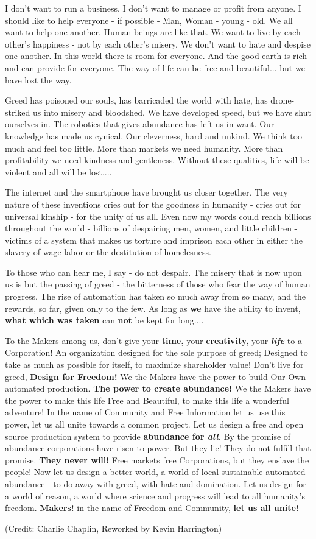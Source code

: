 \documentclass{article}
\begin{document}
{\fontsize{11pt}{11pt}\selectfont
I don't want to run a business. I don't want to manage or profit from
anyone. I should like to help everyone - if possible - Man, Woman -
young - old. We all want to help one another. Human beings are like
that. We want to live by each other's happiness - not by each other's
misery. We don't want to hate and despise one another. In this world
there is room for everyone. And the good earth is rich and can provide
for everyone. The way of life can be free and beautiful... but we have
lost the way.

Greed has poisoned our souls, has barricaded the world with hate, has
drone-striked us into misery and bloodshed. We have developed speed, but
we have shut ourselves in. The robotics that gives abundance has left us in
want. Our knowledge has made us cynical. Our cleverness, hard and
unkind. We think too much and feel too little. More than markets we need
humanity. More than profitability we need kindness and gentleness.
Without these qualities, life will be violent and all will be lost....

The internet and the smartphone have brought us closer together. The
very nature of these inventions cries out for the goodness in humanity -
cries out for universal kinship - for the unity of us all. Even now my
words could reach billions throughout the world - billions of
despairing men, women, and little children - victims of a system that
makes us torture and imprison each other in either the slavery of wage labor or the destitution of homelesness.

To those who can hear me, I say - do not despair. The misery that is now
upon us is but the passing of greed - the bitterness of those who fear
the way of human progress. The rise of automation has taken so much away
from so many, and the rewards, so far, given only to the few. As long as
\textbf{we} have the ability to invent, \textbf{what which was taken} can
\textbf{not} be kept for long....

To the Makers among us, don't give your \textbf{time,} your
\textbf{creativity,} your \emph{\textbf{life}} to a Corporation! An
organization designed for the sole purpose of greed; Designed to take as
much as possible for itself, to maximize shareholder value! Don't live
for greed, \textbf{Design for Freedom!} We the Makers have the power to
build Our Own automated production. \textbf{The power to create abundance!} We the Makers have the power to make this life Free and
Beautiful, to make this life a wonderful adventure! In the name of
Community and Free Information let us use this power, let us all unite
towards a common project. Let us design a free and open source
production system to provide \textbf{abundance for \emph{all}}\emph{.}
By the promise of abundance corporations have risen to power. But they
lie! They do not fulfill that promise. \textbf{They never will!} Free
markets free Corporations, but they enslave the people! Now let us
design a better world, a world of local sustainable automated abundance
- to do away with greed, with hate and domination. Let us design for a
world of reason, a world where science and progress will lead to all
humanity's freedom. \textbf{Makers!} in the name of Freedom and
Community, \textbf{let us all unite!}

(Credit: Charlie Chaplin, Reworked by Kevin Harrington)

}
\end{document}
